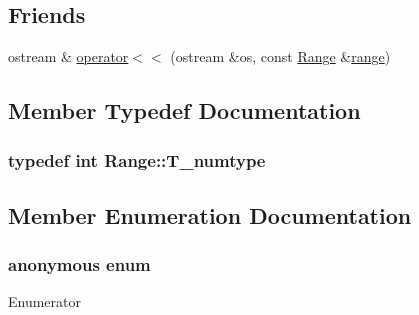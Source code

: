 \subsection*{Friends}
\begin{DoxyCompactItemize}
\item 
ostream \& \hyperlink{classRange_ab26640a4547c7d20f06f4adff50713a9}{operator$<$$<$} (ostream \&os, const \hyperlink{classRange}{Range} \&\hyperlink{numinquire_8h_a35e47346e37a09731e9c2d704288937d}{range})
\end{DoxyCompactItemize}


\subsection{Member Typedef Documentation}
\hypertarget{classRange_a7a87483a88a6bc1ae142f15459a6b630}{}
\subsubsection[{T\+\_\+numtype}]{\setlength{\rightskip}{0pt plus 5cm}typedef int {\bf Range\+::\+T\+\_\+numtype}}\label{classRange_a7a87483a88a6bc1ae142f15459a6b630}


\subsection{Member Enumeration Documentation}
\hypertarget{classRange_a2b1b2460ff7aab2f436e5fea6ca23391}{}\subsubsection[{anonymous enum}]{\setlength{\rightskip}{0pt plus 5cm}anonymous enum}\label{classRange_a2b1b2460ff7aab2f436e5fea6ca23391}
\begin{Desc}
\item[Enumerator]\par
\begin{description}
\item[{\em 
\hypertarget{classRange_a2b1b2460ff7aab2f436e5fea6ca23391a3311c8d65af747a2557d7bcc08ab3f0c}{}from\+Start\label{classRange_a2b1b2460ff7aab2f436e5fea6ca23391a3311c8d65af747a2557d7bcc08ab3f0c}
}]\item[{\em 
\hypertarget{classRange_a2b1b2460ff7aab2f436e5fea6ca23391a552a0421135e863c3d93e9896c777f34}{}to\+End\label{classRange_a2b1b2460ff7aab2f436e5fea6ca23391a552a0421135e863c3d93e9896c777f34}
}]\end{description}
\end{Desc}


